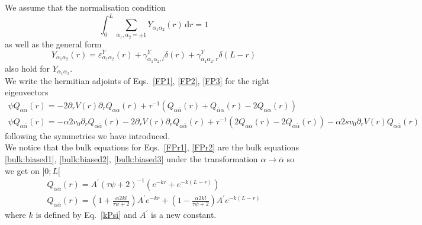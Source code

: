 \documentclass[pre,aps,superscriptaddress,nofootinbib]{revtex4}
\begin{document}
We assume that the normalisation condition
\begin{equation}
\int_0^L \sum_{\alpha_1, \alpha_2 = \pm 1} Y_{\alpha_1\alpha_2}(r) \, \mathrm{d}r = 1
\label{normalisation_pave}
\end{equation}
as well as the general form
\begin{equation}
Y_{\alpha_1\alpha_2}(r) = \varepsilon_{\alpha_1\alpha_2}^Y(r) + \gamma_{\alpha_1\alpha_2,l}^Y \delta (r) + \gamma_{\alpha_1\alpha_2,r}^Y \delta (L - r)
\end{equation}
also hold for $Y_{\alpha_1\alpha_2}$.\\

We write the hermitian adjoints of Eqs.~\ref{FP1}, \ref{FP2}, \ref{FP3} for the right eigenvectors
\begin{eqnarray}
\label{FPr1}
\psi Q_{\alpha\alpha}(r) = -2 \partial_r V(r) \partial_r Q_{\alpha\alpha}(r) + \tau^{-1} (Q_{\alpha\overline{\alpha}}(r) + Q_{\overline{\alpha}\alpha}(r) - 2 Q_{\alpha\alpha}(r))\\
\label{FPr2}
\psi Q_{\alpha\overline{\alpha}}(r) = - \alpha 2 v_0 \partial_r Q_{\alpha\overline{\alpha}}(r) - 2 \partial_r V(r) \partial_r Q_{\alpha\overline{\alpha}}(r) + \tau^{-1} (2 Q_{\alpha\alpha}(r) - 2 Q_{\alpha\overline{\alpha}}(r)) - \alpha 2 s v_0 \partial_r V(r) Q_{\alpha\overline{\alpha}}(r)
\end{eqnarray}
following the symmetries we have introduced.\\

We notice that the bulk equations for Eqs.~\ref{FPr1}, \ref{FPr2} are the bulk equations \eqref{bulk:biased1}, \eqref{bulk:biased2}, \eqref{bulk:biased3} under the transformation $\alpha \to \overline{\alpha}$ so we get on $]0;L[$
\begin{eqnarray}
Q_{\alpha\alpha}(r) = A^{\prime} (\tau \psi + 2)^{-1} (e^{-k r} + e^{-k (L - r)})\\
Q_{\alpha\overline{\alpha}}(r) = \left(1 + \frac{\alpha 2 k l}{\tau \psi + 2}\right) A^{\prime} e^{- k r} + \left(1 - \frac{\alpha 2 k l}{\tau \psi + 2}\right) A^{\prime} e^{- k (L - r)}
\end{eqnarray}
where $k$ is defined by Eq.~\ref{kPsi} and $A^{\prime}$ is a new constant.\\
\end{document}
